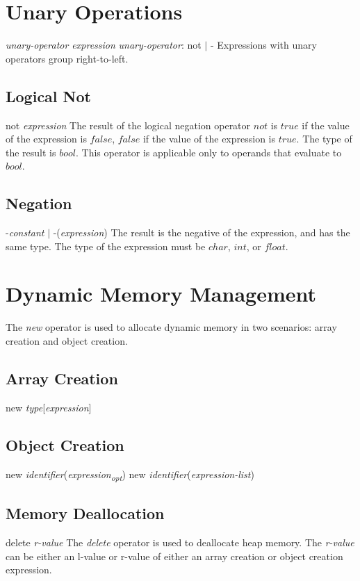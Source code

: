 \begin{homeworkProblem}
    \section{Unary Operations}
    \textit{unary-operator expression}
    \newline
    \textit{unary-operator}: not $|$ -
     \newline
     Expressions with unary operators group right-to-left.

    \subsection{Logical Not}
    not \textit{expression}
    \newline
    The result of the logical negation operator $not$ is $true$ if the value of the expression is $false$, $false$ if the value of the expression is $true$. The type of the result is $bool$. This operator is applicable only to operands that evaluate to $bool$.

    \subsection{Negation}
    -\textit{constant} $|$ -(\textit{expression})
    \newline
    The result is the negative of the expression, and has the same type. The type of the expression must be $char$, $int$, or $float$.

    \section{Dynamic Memory Management}
    The \textit{new} operator is used to allocate dynamic memory in two scenarios: array creation and object creation.
    \subsection{Array Creation}
    new \textit{type}[\textit{expression}]
    \subsection{Object Creation}
    new \textit{identifier}(\textit{expression\textsubscript{opt}})
    \newline
    new \textit{identifier}(\textit{expression-list})

    \subsection{Memory Deallocation}
    delete \textit{r-value}
    \newline
    The \textit{delete} operator is used to deallocate heap memory. The \textit{r-value} can be either an l-value or r-value of either an array creation or object creation expression.


\end{homeworkProblem}
